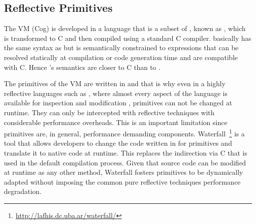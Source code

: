 \subsection{Reflective Primitives}
The \PH VM (Cog) is developed in a language that is a subset of \ST, known as \Slang, which is transformed to C and then compiled using a standard C compiler.  
\Slang basically has the same syntax as \ST but is semantically constrained to expressions that can be resolved statically at compilation or code generation time and are compatible with C.
Hence \Slang's semantics are closer to C than to \ST. 

The primitives of the VM are written in \Slang and that is why even in a highly reflective languages such as \ST, where almost every aspect of the language is available for inspection and modification \cite{Denk10a}, primitives can not be changed at runtime. They can only be intercepted with reflective techniques with considerable performance overheads.
This is an important limitation since primitives are, in general, performance demanding components.
Waterfall~\cite{Char13a}\footnote{\url{http://lafhis.dc.uba.ar/waterfall/}} is a tool that allows developers to change the code written in \Slang for primitives and translate it to native code at runtime.
This replaces the indirection via C that is used in the default compilation process.
Given that \Slang source code can be modified at runtime as any other \ST method, Waterfall fosters primitives to be dynamically adapted without imposing the common pure reflective techniques performance degradation.

